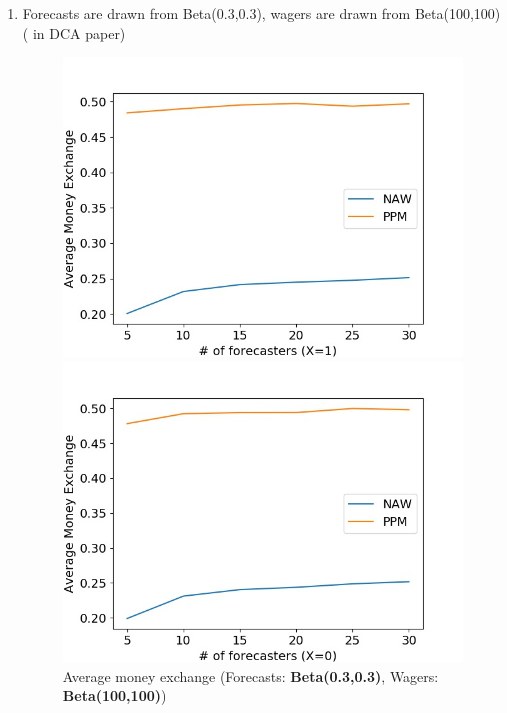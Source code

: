 \documentclass[english,10pt]{article}
\begin{document}
\begin{enumerate}
	\item Forecasts are drawn from Beta(0.3,0.3), wagers are drawn from Beta(100,100) ( in DCA paper)
	\begin{figure}[H]
        	\centering
        	\begin{minipage}{0.48\textwidth}
        	\includegraphics[width = \textwidth]{(Beta(0dot3_0dot3)F_Beta(100_100)W)Avg_MnEx(X=1).jpg}
        	\end{minipage}
        	\begin{minipage}{0.48\textwidth}
        	\includegraphics[width = \textwidth]{(Beta(0dot3_0dot3)F_Beta(100_100)W)Avg_MnEx(X=0).jpg}
        	\end{minipage}
        	\caption{Average money exchange (Forecasts: \textbf{Beta(0.3,0.3)}, Wagers: \textbf{Beta(100,100)})}
        	\end{figure}
	

\end{enumerate}
\end{document}
